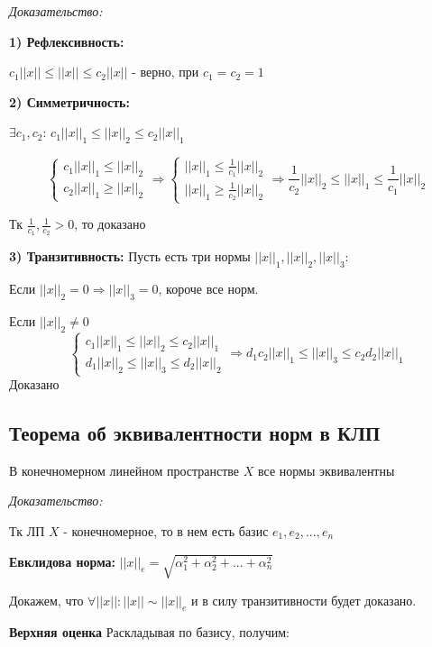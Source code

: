 \documentclass[12pt]{article}
\begin{document}
\textit{Доказательство:}

	\textbf{1) Рефлексивность:}
		
		$c_1||x|| \leq ||x|| \leq c_2||x||$ - верно, при $c_1 = c_2 = 1$
		
	\textbf{2)	Симметричность:}
	
		 $\exists c_1, c_2$:
		$c_1||x||_1 \leq ||x||_2 \leq c_2||x||_1$
	
$$
\begin{cases}
   c_1||x||_1 \leq ||x||_2 \\
   c_2||x||_1  \ge ||x||_2  
\end{cases}
\Rightarrow
\begin{cases}
   ||x||_1 \leq \frac{1}{c_1}||x||_2 \\
   ||x||_1  \ge \frac{1}{c_2}||x||_2  
   
\end{cases}
\Rightarrow
\frac{1}{c_2}||x||_2 \leq ||x||_1 \leq \frac{1}{c_1}||x||_2
$$

Тк $\frac{1}{c_1} , \frac{1}{c_2} > 0$, то доказано

			
	\textbf{3)	Транзитивность:}
	Пусть есть три нормы $||x||_1 , ||x||_2 , ||x||_3$:
	
	Если $||x||_2 = 0 \Rightarrow ||x||_3 = 0$, короче все норм.
	
	Если $||x||_2 \neq 0 $
		$$
\begin{cases}
	c_1||x||_1 \leq ||x||_2 \leq c_2||x||_1 \\
	d_1||x||_2 \leq ||x||_3 \leq d_2||x||_2
\end{cases}
\Rightarrow
	d_1 c_2 ||x||_1 \leq ||x||_3  \leq c_2 d_2||x||_1
$$
		Доказано
		
\subsection{Теорема об эквивалентности норм в КЛП}
	В конечномерном линейном пространстве $X$ все нормы эквивалентны
	
\textit{Доказательство:}
	
	Тк ЛП $X$ - конечномерное, то в нем есть базис $e_1 , e_2, ..., e_n$
		
	\textbf{Евклидова норма:} $||x||_e = \sqrt{\alpha_1^2 + \alpha_2^2 + ... +\alpha_n^2  }$
	
	Докажем, что $\forall ||x|| : ||x|| \sim ||x||_e$ и в силу транзитивности будет доказано.
	
\textbf{	Верхняя оценка}
	Раскладывая по базису, получим:
	
\end{document}
